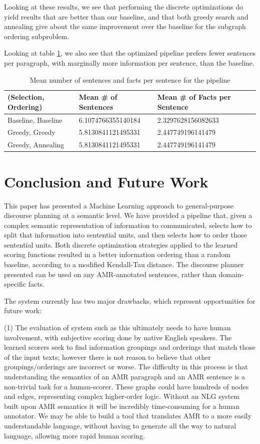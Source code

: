 \documentclass[12pt]{article}
\begin{document}
Looking at these results, we see that performing the discrete optimizations do
yield results that are better than our baseline, and that both greedy search
and annealing give about the same improvement over the baseline for the
subgraph ordering subproblem.

Looking at table \ref{tab:metrics}, we also see that the optimized pipeline
prefers fewer sentences per paragraph, with marginally more information per
sentence, than the baseline.

\begin{table}[H]
\centering
\caption{Mean number of sentences and facts per sentence for the pipeline}
\label{tab:metrics}
\begin{tabular}{@{}lll@{}}
\toprule
\textbf{(Selection, Ordering)} & \textbf{Mean \# of Sentences} & \textbf{Mean \#
of Facts per Sentence} \\ \midrule
Baseline, Baseline & 6.1074766355140184 & 2.3297628156082633 \\
Greedy, Greedy & 5.8130841121495331 & 2.447749196141479 \\
Greedy, Annealing & 5.8130841121495331 & 2.447749196141479 \\ \bottomrule
\end{tabular}
\end{table}

\section{Conclusion and Future Work}
This paper has presented a Machine Learning approach to general-purpose discourse planning at a semantic level. We have provided a pipeline that, given a complex semantic representation of information to communicated, selects how to split that information into sentential units, and then selects how to order those sentential units. Both discrete optimization strategies applied to the learned scoring functions resulted in a better information ordering than a random baseline, according to a modified Kendall-Tau distance. The discourse planner presented can be used on any AMR-annotated sentences, rather than domain-specific facts. 

The system currently has two major drawbacks, which represent opportunities for future work:

(1) The evaluation of system such as this ultimately needs to have human involvement, with subjective scoring done by native English speakers. The learned scorers seek to find information groupings and orderings that match those of the input texts; however there is not reason to believe that other groupings/orderings are incorrect or worse. The difficulty in this process is that understanding the semantics of an AMR paragraph and an AMR sentence is a non-trivial task for a human-scorer. These graphs could have hundreds of nodes and edges, representing complex higher-order logic. Without an NLG system built upon AMR semantics it will be incredibly time-consuming for a human annotator. We may be able to build a tool that translates AMR to a more easily understandable language, without having to generate all the way to natural language, allowing more rapid human scoring. 
\end{document}
